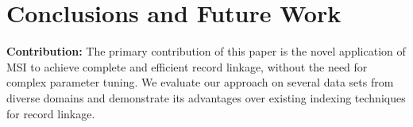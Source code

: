 \documentclass{llncs}
\begin{document}
\section{Conclusions and Future Work}

\textbf{Contribution:} The primary contribution of this paper is the novel application of MSI to achieve complete and efficient record linkage, without the need for complex parameter tuning.
We evaluate our approach on several data sets from diverse domains and demonstrate its advantages over
existing indexing techniques for record linkage.




\label{sec-concl}



 

\end{document}
